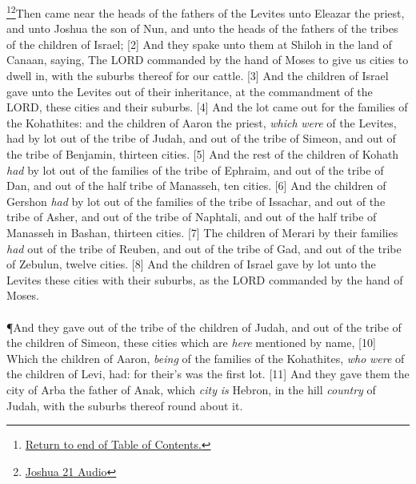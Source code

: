 \footnote{\textcolor[rgb]{0.00,0.25,0.00}{\hyperlink{TOC}{Return to end of Table of Contents.}}}\footnote{\href{https://audiobible.com/bible/joshua_21.html}{\textcolor[cmyk]{0.99998,1,0,0}{Joshua 21 Audio}}}\textcolor[cmyk]{0.99998,1,0,0}{Then came near the heads of the fathers of the Levites unto Eleazar the priest, and unto Joshua the son of Nun, and unto the heads of the fathers of the tribes of the children of Israel;}
[2] \textcolor[cmyk]{0.99998,1,0,0}{And they spake unto them at Shiloh in the land of Canaan, saying, The LORD commanded by the hand of Moses to give us cities to dwell in, with the suburbs thereof for our cattle.}
[3] \textcolor[cmyk]{0.99998,1,0,0}{And the children of Israel gave unto the Levites out of their inheritance, at the commandment of the LORD, these cities and their suburbs.}
[4] \textcolor[cmyk]{0.99998,1,0,0}{And the lot came out for the families of the Kohathites: and the children of Aaron the priest, \emph{which} \emph{were} of the Levites, had by lot out of the tribe of Judah, and out of the tribe of Simeon, and out of the tribe of Benjamin, thirteen cities.}
[5] \textcolor[cmyk]{0.99998,1,0,0}{And the rest of the children of Kohath \emph{had} by lot out of the families of the tribe of Ephraim, and out of the tribe of Dan, and out of the half tribe of Manasseh, ten cities.}
[6] \textcolor[cmyk]{0.99998,1,0,0}{And the children of Gershon \emph{had} by lot out of the families of the tribe of Issachar, and out of the tribe of Asher, and out of the tribe of Naphtali, and out of the half tribe of Manasseh in Bashan, thirteen cities.}
[7] \textcolor[cmyk]{0.99998,1,0,0}{The children of Merari by their families \emph{had} out of the tribe of Reuben, and out of the tribe of Gad, and out of the tribe of Zebulun, twelve cities.}
[8] \textcolor[cmyk]{0.99998,1,0,0}{And the children of Israel gave by lot unto the Levites these cities with their suburbs, as the LORD commanded by the hand of Moses.}\\
\\
\P \textcolor[cmyk]{0.99998,1,0,0}{And they gave out of the tribe of the children of Judah, and out of the tribe of the children of Simeon, these cities which are \emph{here} mentioned by name,}
[10] \textcolor[cmyk]{0.99998,1,0,0}{Which the children of Aaron, \emph{being} of the families of the Kohathites, \emph{who} \emph{were} of the children of Levi, had: for their's was the first lot.}
[11] \textcolor[cmyk]{0.99998,1,0,0}{And they gave them the city of Arba the father of Anak, which \emph{city} \emph{is} Hebron, in the hill \emph{country} of Judah, with the suburbs thereof round about it.}
